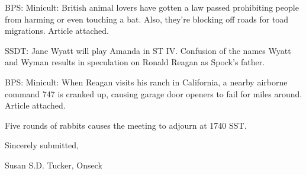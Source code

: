 \documentclass[12pt]{article}
\begin{document}
BPS: Minicult: British animal lovers have gotten a law passed prohibiting people from harming or even touching a bat. Also, they're blocking off roads for toad migrations. Article attached.

SSDT: Jane Wyatt will play Amanda in ST IV. Confusion of the names Wyatt and Wyman results in speculation on Ronald Reagan as Spock's father.

BPS: Minicult: When Reagan visits his ranch in California, a nearby airborne command 747 is cranked up, causing garage door openers to fail for miles around. Article attached.

\vspace{12pt}

\noindent
Five rounds of rabbits causes the meeting to adjourn at 1740 SST.

\vspace{18pt}

\centerline{Sincerely submitted,}
\centerline{Susan S.D. Tucker, Onseck}
\end{document}
